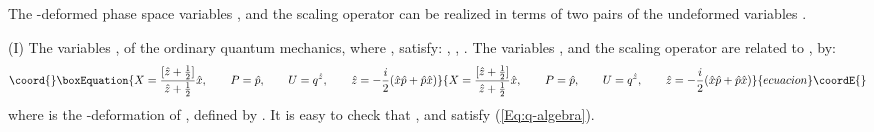 \documentclass[a4paper,12pt]{article}
\providecommand{\half}{{\textstyle\frac{1}{2}}}
\begin{document}
The \coordHE{}-deformed phase space variables \coordHE{}, \coordHE{} and 
the scaling operator \coordHE{} can be realized in terms of two pairs of 
 the undeformed variables \cite{Fichtmuller}. 

(I) The variables \coordHE{}, \coordHE{} of the ordinary quantum mechanics, 
where \coordHE{}, \coordHE{} satisfy:
\coordHE{}, \coordHE{}, 
 \coordHE{}.
The variables \coordHE{}, \coordHE{} and 
the scaling operator \coordHE{} are related to \coordHE{}, \coordHE{} by:
\begin{equation}\coord{}\boxEquation{
\label{Eq:P-p}
X= \frac{[\hat z+\half]}{\hat z+\half}\hat x,  \qquad
P=\hat p, \qquad
U= q^{\hat z}, \qquad    \hat z=-\frac{i}{2}(\hat x\hat p+\hat p\hat x)
}{
X= \frac{[\hat z+\half]}{\hat z+\half}\hat x,  \qquad
P=\hat p, \qquad
U= q^{\hat z}, \qquad    \hat z=-\frac{i}{2}(\hat x\hat p+\hat p\hat x)
}{ecuacion}\coordE{}\end{equation}
where \myHighlight{$[A]$}\coordHE{} is the \coordHE{}-deformation of \coordHE{}, defined by 
\coordHE{}.
 It is easy to check that \coordHE{}, \coordHE{} and \coordHE{} satisfy (\ref{Eq:q-algebra}). 
\end{document}

